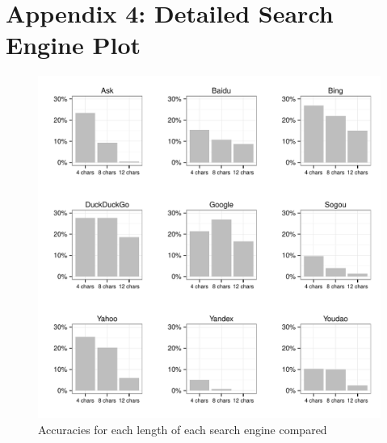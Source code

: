 \documentclass{csfourzero}
\begin{document}
\pagebreak
\section{Appendix 4: Detailed Search Engine Plot}
\begin{figure}[H]
  \centerline{\includegraphics[width=\textwidth]{eng_vs_acc_9_way}}
  \caption{Accuracies for each length of each search engine compared}\label{fig:9searchengines}
\end{figure}
\end{document}
